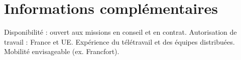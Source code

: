 \documentclass[letterpaper]{twentysecondcv} %
\begin{document}
\section{Informations complémentaires}

Disponibilité : ouvert aux missions en conseil et en contrat. Autorisation de travail : France et UE. Expérience du télétravail et des équipes distribuées. Mobilité envisageable (ex. Francfort).

\end{document}
